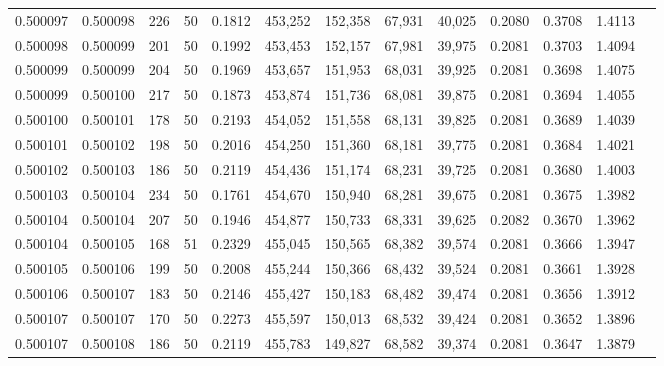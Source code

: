 \begin{tabular}{rrrrrrrrrrrrr}
0.500097 & 0.500098 & 226 &  50 &                                     0.1812 & 453,252 & 152,358 &  67,931 &  40,025 & 0.2080 & 0.3708 & 1.4113 \\
0.500098 & 0.500099 & 201 &  50 &                                     0.1992 & 453,453 & 152,157 &  67,981 &  39,975 & 0.2081 & 0.3703 & 1.4094 \\
0.500099 & 0.500099 & 204 &  50 &                                     0.1969 & 453,657 & 151,953 &  68,031 &  39,925 & 0.2081 & 0.3698 & 1.4075 \\
0.500099 & 0.500100 & 217 &  50 &                                     0.1873 & 453,874 & 151,736 &  68,081 &  39,875 & 0.2081 & 0.3694 & 1.4055 \\
0.500100 & 0.500101 & 178 &  50 &                                     0.2193 & 454,052 & 151,558 &  68,131 &  39,825 & 0.2081 & 0.3689 & 1.4039 \\
0.500101 & 0.500102 & 198 &  50 &                                     0.2016 & 454,250 & 151,360 &  68,181 &  39,775 & 0.2081 & 0.3684 & 1.4021 \\
0.500102 & 0.500103 & 186 &  50 &                                     0.2119 & 454,436 & 151,174 &  68,231 &  39,725 & 0.2081 & 0.3680 & 1.4003 \\
0.500103 & 0.500104 & 234 &  50 &                                     0.1761 & 454,670 & 150,940 &  68,281 &  39,675 & 0.2081 & 0.3675 & 1.3982 \\
0.500104 & 0.500104 & 207 &  50 &                                     0.1946 & 454,877 & 150,733 &  68,331 &  39,625 & 0.2082 & 0.3670 & 1.3962 \\
0.500104 & 0.500105 & 168 &  51 &                                     0.2329 & 455,045 & 150,565 &  68,382 &  39,574 & 0.2081 & 0.3666 & 1.3947 \\
0.500105 & 0.500106 & 199 &  50 &                                     0.2008 & 455,244 & 150,366 &  68,432 &  39,524 & 0.2081 & 0.3661 & 1.3928 \\
0.500106 & 0.500107 & 183 &  50 &                                     0.2146 & 455,427 & 150,183 &  68,482 &  39,474 & 0.2081 & 0.3656 & 1.3912 \\
0.500107 & 0.500107 & 170 &  50 &                                     0.2273 & 455,597 & 150,013 &  68,532 &  39,424 & 0.2081 & 0.3652 & 1.3896 \\
0.500107 & 0.500108 & 186 &  50 &                                     0.2119 & 455,783 & 149,827 &  68,582 &  39,374 & 0.2081 & 0.3647 & 1.3879 \\

\end{tabular}
